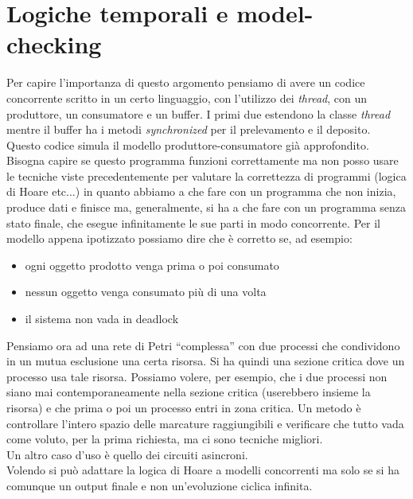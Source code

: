 \documentclass[a4paper,12pt, oneside]{book}
\begin{document}
\chapter{Logiche temporali e model-checking}
Per capire l'importanza di questo argomento pensiamo di avere un codice
concorrente scritto in un certo linguaggio, con l'utilizzo dei \textit{thread},
con un produttore, un consumatore e un buffer. I primi due estendono la classe
\textit{thread} mentre il buffer ha i metodi \textit{synchronized} per il
prelevamento e il deposito. Questo codice simula il modello
produttore-consumatore già approfondito. Bisogna capire se questo programma
funzioni correttamente ma non posso usare le tecniche viste precedentemente per
valutare la correttezza di programmi (logica di Hoare etc$\ldots$) in quanto
abbiamo a che fare con un programma che non inizia, produce dati e finisce ma,
generalmente, si ha a che fare con un programma senza stato finale, che esegue
infinitamente le sue parti in modo concorrente. Per il modello appena ipotizzato
possiamo dire che è corretto se, ad esempio:
\begin{itemize}
  \item ogni oggetto prodotto venga prima o poi consumato
  \item nessun oggetto venga consumato più di una volta
  \item il sistema non vada in deadlock
\end{itemize}
Pensiamo ora ad una rete di Petri ``complessa'' con due processi che
condividono in un mutua esclusione una certa risorsa. Si ha quindi una sezione
critica dove un processo usa tale risorsa. Possiamo volere, per esempio, che i
due processi non siano mai contemporaneamente nella sezione critica (userebbero
insieme la risorsa) e che prima o poi un processo entri in zona critica. Un
metodo è controllare l'intero spazio delle marcature raggiungibili e verificare
che tutto vada come voluto, per la prima richiesta, ma ci sono tecniche
migliori.  \\
Un altro caso d'uso è quello dei circuiti asincroni.\\
Volendo si può adattare la logica di Hoare a modelli concorrenti ma solo se si
ha comunque un output finale e non un'evoluzione ciclica infinita.
\end{document}
